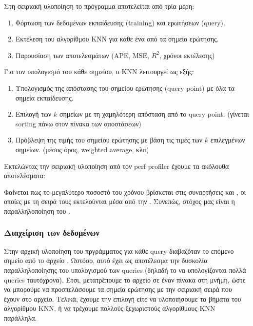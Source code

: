 \documentclass[11pt]{scrartcl} %
\begin{document}
Στη σειριακή υλοποίηση το πρόγραμμα αποτελείται από τρία μέρη: 

\begin{enumerate}
    \item Φόρτωση των δεδομένων εκπαίδευσης (training) και ερωτήσεων (query).
    \item Εκτέλεση του αλγορίθμου KNN για κάθε ένα από τα σημεία ερώτησης.
    \item Παρουσίαση των αποτελεσμάτων (APE, MSE, $R^2$, χρόνοι εκτέλεσης)
\end{enumerate}

Για τον υπολογισμό του κάθε σημείου, ο KNN λειτουργεί ως εξής:

\begin{enumerate}
    \item Υπολογισμός της απόστασης του σημείου ερώτησης (query point) με όλα τα σημεία εκπαίδευσης.
    \item Επιλογή των $k$ σημείων με τη χαμηλότερη απόσταση από το query point. (γίνεται sorting πάνω στον πίνακα των αποστάσεων)
    \item Πρόβλεψη της τιμής του σημείου ερώτησης με βάση τις τιμές των $k$ επιλεγμένων σημείων. (μέσος όρος, weighted average, κλπ)
\end{enumerate}

Εκτελώντας την σειριακή υλοποίηση από τον perf profiler έχουμε τα ακόλουθα αποτελέσματα:



Φαίνεται πως το μεγαλύτερο ποσοστό του χρόνου βρίσκεται στις συναρτήσεις  και , οι οποίες με τη σειρά τους εκτελούνται 
μέσα από την . Συνεπώς, στόχος μας είναι η παραλληλοποίηση του .

\subsubsection{Διαχείριση των δεδομένων}

Στην αρχική υλοποίηση του πργράμματος για κάθε query διαβαζόταν το επόμενο σημείο από το αρχείο . 
Ωστόσο, αυτό έχει ως αποτέλεσμα την δυσκολία παραλληλοποίησης του υπολογισμού των queries (δηλαδή το να υπολογίζονται πολλά queries ταυτόχρονα).
Έτσι, μετατρέπουμε το αρχείο  σε έναν πίνακα στη μνήμη, ώστε να μπορούμε να προσπελάσουμε τα σημεία ερώτησης με την σειριακή σειρά που έχουν στο αρχείο.
Τελικά, έχουμε την επιλογή είτε να υλοποιήσουμε τα βήματα του αλγορίθμου KNN, ή να τρέχουμε πολλούς ξεχωριστούς αλγορίθμους KNN παράλληλα.
\end{document}
